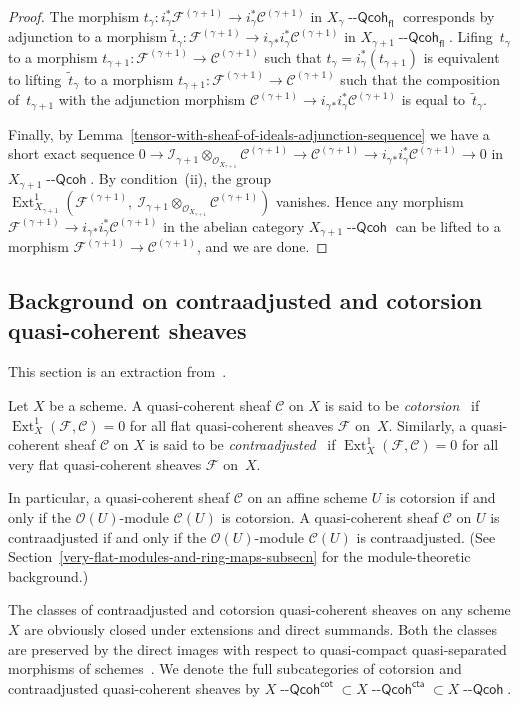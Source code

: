 \documentclass[12pt,a4paper]{amsart}
\newcommand{\+}{\protect\nobreakdash-}
\renewcommand{\:}{\colon}
\newcommand{\rarrow}{\longrightarrow}
\newcommand{\ot}{\otimes}
\DeclareMathOperator{\Ext}{Ext}
\newcommand{\Qcoh}{{\operatorname{\mathsf{--Qcoh}}}}
\newcommand{\fl}{\mathsf{fl}}
\newcommand{\cta}{\mathsf{cta}}
\renewcommand{\cot}{\mathsf{cot}}
\newcommand{\cO}{\mathcal O}
\newcommand{\cI}{\mathcal I}
\newcommand{\cF}{\mathcal F}
\newcommand{\cC}{\mathcal C}
\newcommand{\rC}{\mathscr C}
\newcommand{\rF}{\mathscr F}
\theoremstyle{plain}
\theoremstyle{definition}
\begin{document}
\begin{proof}
 The morphism $t_\gamma\:i_\gamma^*\rF^{(\gamma+1)}\rarrow
i_\gamma^*\rC^{(\gamma+1)}$ in $X_\gamma\Qcoh_\fl$ corresponds by
adjunction to a morphism $\tilde t_\gamma\:\rF^{(\gamma+1)}\rarrow
i_\gamma{}_*i_\gamma^*\rC^{(\gamma+1)}$ in $X_{\gamma+1}\Qcoh_\fl$.
 Lifing~$t_\gamma$ to a morphism $t_{\gamma+1}\:\rF^{(\gamma+1)}
\rarrow\rC^{(\gamma+1)}$ such that $t_\gamma=i_\gamma^*(t_{\gamma+1})$
is equivalent to lifting~$\tilde t_\gamma$ to a morphism
$t_{\gamma+1}\:\rF^{(\gamma+1)}\rarrow\rC^{(\gamma+1)}$ such that
the composition of~$t_{\gamma+1}$ with the adjunction morphism
$\rC^{(\gamma+1)}\rarrow i_\gamma{}_*i_\gamma^*\rC^{(\gamma+1)}$
is equal to~$\tilde t_\gamma$.

 Finally, by
Lemma~\ref{tensor-with-sheaf-of-ideals-adjunction-sequence} we have
a short exact sequence $0\rarrow\cI_{\gamma+1}
\ot_{\cO_{X_{\gamma+1}}}\rC^{(\gamma+1)}\rarrow\rC^{(\gamma+1)}
\rarrow i_\gamma{}_*i_\gamma^*\rC^{(\gamma+1)}\rarrow0$ in
$X_{\gamma+1}\Qcoh$.
 By condition~(ii), the group
$\Ext^1_{X_{\gamma+1}}(\rF^{(\gamma+1)},\>
\cI_{\gamma+1}\ot_{\cO_{X_{\gamma+1}}}\rC^{(\gamma+1)})$ vanishes.
 Hence any morphism $\rF^{(\gamma+1)}\rarrow
i_\gamma{}_*i_\gamma^*\rC^{(\gamma+1)}$ in the abelian category
$X_{\gamma+1}\Qcoh$ can be lifted to a morphism
$\rF^{(\gamma+1)}\rarrow\rC^{(\gamma+1)}$, and we are done.
\end{proof}

\subsection{Background on contraadjusted and cotorsion
quasi-coherent sheaves}
 This section is an extraction from~\cite[Section~4.1]{Pcosh}.

 Let $X$ be a scheme.
 A quasi-coherent sheaf $\cC$ on $X$ is said to be
\emph{cotorsion}~\cite{EE} if $\Ext^1_X(\cF,\cC)=0$ for all flat
quasi-coherent sheaves $\cF$ on~$X$.
 Similarly, a quasi-coherent sheaf $\cC$ on $X$ is said to be
\emph{contraadjusted}~\cite[Sections~2.5 and~4.1]{Pcosh} if
$\Ext^1_X(\cF,\cC)=0$ for all very flat quasi-coherent sheaves $\cF$
on~$X$.

 In particular, a quasi-coherent sheaf $\cC$ on an affine scheme $U$
is cotorsion if and only if the $\cO(U)$\+module $\cC(U)$ is
cotorsion.
 A quasi-coherent sheaf $\cC$ on $U$ is contraadjusted if and only
if the $\cO(U)$\+module $\cC(U)$ is contraadjusted.
 (See Section~\ref{very-flat-modules-and-ring-maps-subsecn}
for the module-theoretic background.)

 The classes of contraadjusted and cotorsion quasi-coherent sheaves
on any scheme $X$ are obviously closed under extensions and direct
summands.
 Both the classes are preserved by the direct images with respect to
quasi-compact quasi-separated morphisms of
schemes~\cite[Section~2.5]{Pcosh}.
 We denote the full subcategories of cotorsion and contraadjusted
quasi-coherent sheaves by $X\Qcoh^\cot\subset X\Qcoh^\cta\subset
X\Qcoh$.
\end{document}
